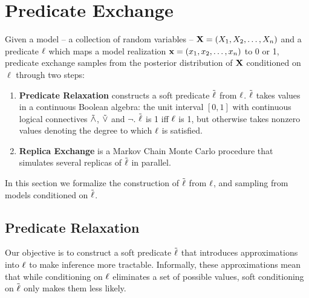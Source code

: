\section{Predicate Exchange}

Given a model -- a collection of random variables -- $\mathbf{X} = (X_1, X_2, \dots, X_n)$ and a predicate $\operatorname{\ell}$ which maps a model realization  $\mathbf{x} = (x_1, x_2, \dots, x_n)$ to 0 or 1, predicate exchange samples from the posterior distribution of $\mathbf{X}$ conditioned on $\ell$ through two steps:
\begin{enumerate}
\item \textbf{Predicate Relaxation} constructs a soft predicate $\mathrel{\tilde{\operatorname{\ell}}}$ from $\operatorname{\ell}$. $\mathrel{\tilde{\operatorname{\ell}}}$ takes values in a continuous Boolean algebra: the unit interval $[0, 1]$ with continuous logical connectives $\mathrel{\tilde{\land}}$, $\mathrel{\tilde{\lor}}$ and $\neg$.
$\mathrel{\tilde{\operatorname{\ell}}}$ is 1 iff $\operatorname{\ell}$ is 1, but otherwise takes nonzero values denoting the degree to which $\operatorname{\ell}$ is satisfied.
\item  \textbf{Replica Exchange} is a Markov Chain Monte Carlo procedure that simulates several replicas of $\mathrel{\tilde{\operatorname{\ell}}}$ in parallel. 
\end{enumerate}

In this section we formalize the construction of $\mathrel{\tilde{\operatorname{\ell}}}$ from $\operatorname{\ell}$, and sampling from models conditioned on $\mathrel{\tilde{\operatorname{\ell}}}$.

\subsection{Predicate Relaxation}\label{predexchange}

Our objective is to construct a soft predicate $\mathrel{\tilde{\operatorname{\ell}}}$ that introduces approximations into $\operatorname{\ell}$ to make inference more tractable.
Informally, these approximations mean that while conditioning on $\operatorname{\ell}$ eliminates a set of possible values, soft conditioning on $\mathrel{\tilde{\operatorname{\ell}}}$ only makes them less likely.

